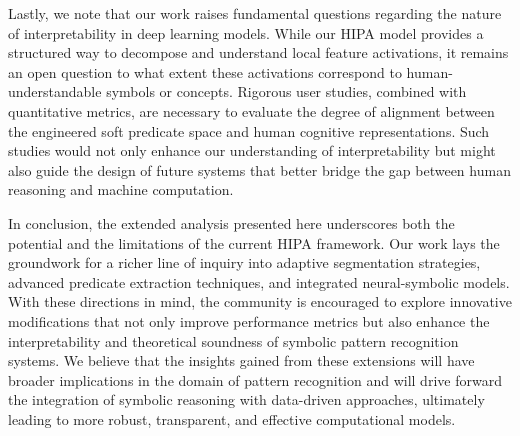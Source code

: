 \documentclass[11pt]{article}
\begin{document}
Lastly, we note that our work raises fundamental questions regarding the nature of interpretability in deep learning models. While our HIPA model provides a structured way to decompose and understand local feature activations, it remains an open question to what extent these activations correspond to human-understandable symbols or concepts. Rigorous user studies, combined with quantitative metrics, are necessary to evaluate the degree of alignment between the engineered soft predicate space and human cognitive representations. Such studies would not only enhance our understanding of interpretability but might also guide the design of future systems that better bridge the gap between human reasoning and machine computation.

In conclusion, the extended analysis presented here underscores both the potential and the limitations of the current HIPA framework. Our work lays the groundwork for a richer line of inquiry into adaptive segmentation strategies, advanced predicate extraction techniques, and integrated neural-symbolic models. With these directions in mind, the community is encouraged to explore innovative modifications that not only improve performance metrics but also enhance the interpretability and theoretical soundness of symbolic pattern recognition systems. We believe that the insights gained from these extensions will have broader implications in the domain of pattern recognition and will drive forward the integration of symbolic reasoning with data-driven approaches, ultimately leading to more robust, transparent, and effective computational models.
\end{document}
